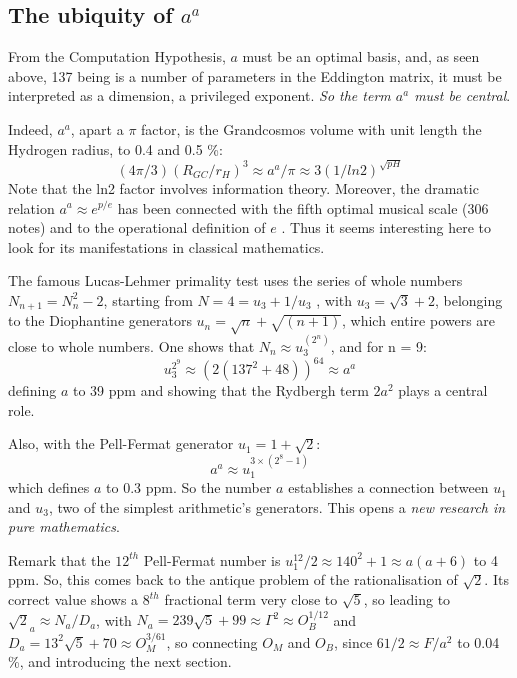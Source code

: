 \documentclass[twoside,draft]{article}
\begin{document}
\begin{sloppypar}
\subsection{The ubiquity of $a^{a}$}

From the Computation Hypothesis, $a$ must be an optimal basis, and, as seen above, 137 being is a number of parameters in the Eddington matrix, it must be interpreted as a dimension, a privileged exponent. \textit{So the term $a^a$ must be central}.
    
Indeed, $a^a$, apart a $\pi$ factor, is the Grandcosmos volume with unit length the Hydrogen radius, to 0.4 and 0.5 \%:
\begin{equation}
(4\pi/3)(R_{GC}/r_H)^3 \approx a^a/\pi \approx 3(1/ln2)^{\sqrt{pH}}
\end{equation}
Note that the ln2 factor involves information theory.
Moreover, the dramatic relation $a^a\approx e^{p/e}$ has been connected with the fifth optimal musical scale (306 notes) and to the operational definition of $e$ \cite{Sanchez1}. Thus it seems interesting here to look for its manifestations in classical mathematics. 

The famous Lucas-Lehmer primality test uses the series of whole numbers $N_{n+1} = N_{n}^{2}-2$,
starting from $N = 4 = u_{3} + 1/u_{3}$ , with $u_{3} = \sqrt{3} + 2$, belonging to the Diophantine generators $u_{n} = \sqrt{n} + \sqrt{(n+1)}$, which entire powers are close to whole numbers. One shows that $N_{n} \approx u_{3}^{(2^{n})}$, and for n = 9:
\begin{equation}
u_{3}^{2^9} \approx (2(137^{2} + 48))^{64} \approx a^{a}
\end{equation}
defining $a$ to 39 ppm and showing that the Rydbergh term $2a^2$ plays a central role.

Also, with the Pell-Fermat generator $u_{1} = 1 + \sqrt{2}$:
\begin{equation}
a^{a} \approx u_1^{3\times(2^{8}-1)}
\end{equation}
which defines $a$ to 0.3 ppm. So the number $a$ establishes a connection between $u_{1}$ and $u_{3}$, two of the
simplest arithmetic's generators. This opens a \textit{new research in pure mathematics}.

Remark that the $12^{th}$ Pell-Fermat number is $ u_1^{12}/2 \approx 140^2 + 1 \approx a(a+6)$ to 4 ppm. So, this comes back to the antique problem of the rationalisation of $\sqrt{2}$. Its correct value shows a $8^{th}$ fractional term very close to $\sqrt{5}$, so leading to $\sqrt{2}_a \approx N_{a}/D_{a}$, with $ N_{a} = 239 \sqrt{5} + 99 \approx \Gamma^{2}
\approx O_B^{1/12} $ and $ D_{a} = 13^2 \sqrt{5} + 70 \approx O_M^{3/61}$,
so connecting $O_M$ and $O_B$, since $61/2 \approx F/a^{2}$ to 0.04 \%, and introducing the next section.


\end{sloppypar}
\end{document}
